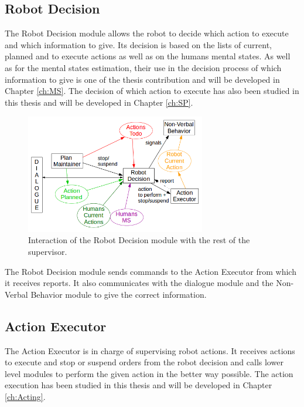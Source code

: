 \documentclass[english,a4paper,11pt,twoside]{StyleThese}
\begin{document}
\subsection{Robot Decision}

The Robot Decision module allows the robot to decide which action to execute and which information to give. Its decision is based on the lists of current, planned and to execute actions as well as on the humans mental states. As well as for the mental states estimation, their use in the decision process of which information to give is one of the thesis contribution and will be developed in Chapter \ref{ch:MS}. The decision of which action to execute has also been studied in this thesis and will be developed in Chapter \ref{ch:SP}.

\begin{figure}[h]
	\centering
    \includegraphics[width=0.7\textwidth]{figs/Chapter2/RobotDecision.png}
    \caption{Interaction of the Robot Decision module with the rest of the supervisor.}
    \label{fig:robotDecition}
\end{figure}

The Robot Decision module sends commands to the Action Executor from which it receives reports. It also communicates with the dialogue module and the Non-Verbal Behavior module to give the correct information.

\subsection{Action Executor}

The Action Executor is in charge of supervising robot actions. It receives actions to execute and stop or suspend orders from the robot decision and calls lower level modules to perform the given action in the better way possible. The action execution has been studied in this thesis and will be developed in Chapter \ref{ch:Acting}.
\end{document}

